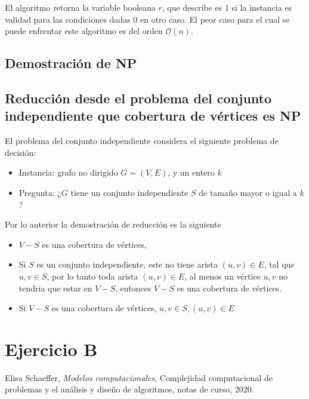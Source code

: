 \documentclass[letterpaper,11pt]{article}
\begin{document}
El algoritmo retorna la variable booleana $r$, que describe es 1 si la instancia es validad para las condiciones dadas 0 en otro caso. El peor caso para el cual se puede enfrentar este algoritmo es del orden $\mathcal{O}(n)$.

\subsection{Demostración de NP}

\subsection{Reducción desde el problema del conjunto independiente que cobertura de vértices es NP}

El problema del conjunto independiente considera el siguiente problema de decisión:
\begin{itemize}
\item Instancia: grafo no dirigido $G=(V,E)$, y un entero $k$
\item Pregunta: ¿$G$ tiene un conjunto independiente $S$ de tamaño mayor o igual a $k$? 
\end{itemize}

Por lo anterior la demostración de reducción es la siguiente

\begin{itemize}
\item $V-S$ es una cobertura de vértices,
\item Si $S$ es un conjunto independiente, este no tiene arista $(u,v)\in E$, tal que $u,v \in S$, por lo tanto toda arista $(u,v)\in E$, al menos un vértice 	$u,v$ no tendria que estar en $V-S$, entonces $V-S$ es una cobertura de vértices.
\item Si $V-S$ es una cobertura de vértices, $u,v\in S, (u,v) \in E $

\end{itemize}

\section{Ejercicio B}


\begin{thebibliography}{0}
   Elisa Schaeffer, \textit{Modelos computacionales}, Complejidad computacional de problemas y el análisis y diseño de algoritmos, notas de curso, 2020.
\end{thebibliography}
\end{document}
